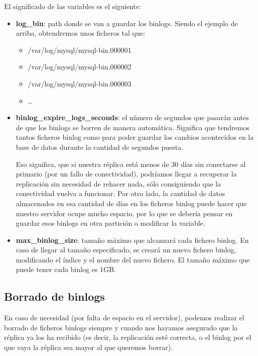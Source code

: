 El significado de las variables es el siguiente:

\begin{itemize}
    \item \textbf{log\_bin}: path donde se van a guardar los binlogs. Siendo el ejemplo de arriba, obtendremos unos ficheros tal que:
    \begin{itemize}
        \item /var/log/mysql/mysql-bin.000001
        \item /var/log/mysql/mysql-bin.000002
        \item /var/log/mysql/mysql-bin.000003
        \item …
    \end{itemize}
    \item \textbf{binlog\_expire\_logs\_seconds}: el número de segundos que pasarán antes de que los binlogs se borren de manera automática. Significa que tendremos tantos ficheros binlog como para poder guardar los cambios acontecidos en la base de datos durante la cantidad de segundos puesta.

    Eso significa, que si nuestra réplica está menos de 30 días sin conectarse al primario (por un fallo de conectividad), podríamos llegar a recuperar la replicación sin necesidad de rehacer nada, sólo consiguiendo que la conectividad vuelva a funcionar. Por otro lado, la cantidad de datos almacenados en esa cantidad de días en los ficheros binlog puede hacer que nuestro servidor ocupe mucho espacio, por lo que se debería pensar en guardar esos binlogs en otra partición o modificar la variable.

    \item \textbf{max\_binlog\_size}: tamaño máximo que alcanzará cada fichero binlog. En caso de llegar al tamaño especificado, se creará un nuevo fichero binlog, modificando el índice y el nombre del nuevo fichero. El tamaño máximo que puede tener cada binlog es 1GB.
\end{itemize}


\subsection{Borrado de binlogs}
En caso de necesidad (por falta de espacio en el servidor), podemos realizar el borrado de ficheros binlogs siempre y cuando nos hayamos asegurado que la réplica ya los ha recibido (es decir, la replicación esté correcta, o el binlog por el que vaya la réplica sea mayor al que queremos borrar).

